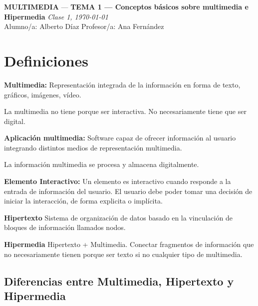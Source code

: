 \documentclass[11pt,a4paper]{article}
\newcommand{\asignatura}{MULTIMEDIA}
\newcommand{\tema}{TEMA 1 — Conceptos básicos sobre multimedia e Hipermedia}  %
\newcommand{\clase}{Clase 1}
\newcommand{\fecha}{\today}                              %
\begin{document}
	{\large \textbf{\asignatura} \;—\; \textbf{\tema} \hfill \textit{\clase, \fecha}}\\[0.4em]
	\faUser\; Alumno/a: Alberto Díaz\hfill
	\faChalkboardTeacher\; Profesor/a: Ana Fernández

	\vspace{0.6em}

	\tableofcontents

	\section{Definiciones}
	\begin{DefBox}
		\textbf{Multimedia:} Representación integrada de la información en forma de texto, gráficos, imágenes, vídeo.

		La multimedia no tiene porque ser interactiva. No necesariamente tiene que ser digital.
	\end{DefBox}



	\begin{DefBox}
		\textbf{Aplicación multimedia:} Software capaz de ofrecer información al usuario integrando distintos medios de representación multimedia.

		La información multimedia se procesa y almacena digitalmente.
	\end{DefBox}

	\begin{DefBox}
		\textbf{Elemento Interactivo: } Un elemento es interactivo cuando responde a la entrada de información del usuario. El usuario debe poder tomar una decisión de iniciar la interacción, de forma explicita o implícita.
	\end{DefBox}

	\begin{DefBox}
		\textbf{Hipertexto} Sistema de organización de datos basado en la vinculación de bloques de información llamados nodos.
	\end{DefBox}

	\begin{DefBox}
		\textbf{Hipermedia} Hipertexto + Multimedia. Conectar fragmentos de información que no necesariamente tienen porque ser texto si no cualquier tipo de multimedia.
	\end{DefBox}

	\subsection{Diferencias entre Multimedia, Hipertexto y Hipermedia}
\end{document}
